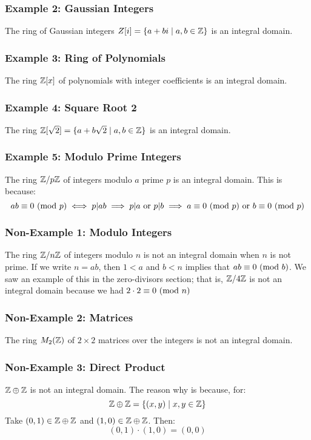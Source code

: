 \documentclass[letterpaper]{article}
\begin{document}
\subsubsection{Example 2: Gaussian Integers}
The ring of Gaussian integers $Z[i] = \{a + bi \mid a, b \in \mathbb{Z}\}$ is an integral domain. 

\subsubsection{Example 3: Ring of Polynomials}
The ring $\mathbb{Z}[x]$ of polynomials with integer coefficients is an integral domain. 

\subsubsection{Example 4: Square Root 2}
The ring $\mathbb{Z}[\sqrt{2}] = \{a + b\sqrt{2} \mid a, b \in \mathbb{Z}\}$ is an integral domain. 

\subsubsection{Example 5: Modulo Prime Integers}
The ring $\mathbb{Z} / p\mathbb{Z}$ of integers modulo $a$ prime $p$ is an integral domain. This is because:
\[ab \equiv 0 \ (\mathrm{mod}\ p) \iff p | ab \implies p | a \text{ or } p | b \implies a \equiv 0 \ (\mathrm{mod}\ p) \text{ or } b \equiv 0 \ (\mathrm{mod}\ p)\] 

\subsubsection{Non-Example 1: Modulo Integers}
The ring $\mathbb{Z} / n\mathbb{Z}$ of integers modulo $n$ is not an integral domain when $n$ is not prime. If we write $n = ab$, then $1 < a$ and $b < n$ implies that $ab \equiv 0 \ (\mathrm{mod}\ b)$. We saw an example of this in the zero-divisors section; that is, $\mathbb{Z} / 4\mathbb{Z}$ is not an integral domain because we had $2 \cdot 2 \equiv 0 \ (\mathrm{mod}\ n)$

\subsubsection{Non-Example 2: Matrices}
The ring $M_{2}(\mathbb{Z})$ of $2 \times 2$ matrices over the integers is not an integral domain. 

\subsubsection{Non-Example 3: Direct Product}
$\mathbb{Z} \oplus \mathbb{Z}$ is not an integral domain. The reason why is because, for:
\[\mathbb{Z} \oplus \mathbb{Z} = \{(x, y) \mid x, y \in \mathbb{Z}\}\]
Take $(0, 1) \in \mathbb{Z} \oplus \mathbb{Z}$ and $(1, 0) \in \mathbb{Z} \oplus \mathbb{Z}$. Then:
\[(0, 1) \cdot (1, 0) = (0, 0)\]
\end{document}

